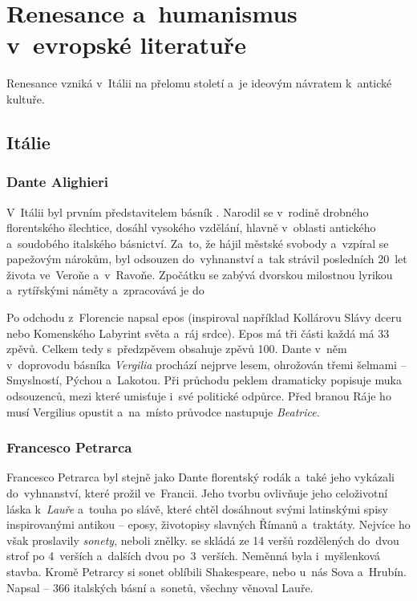 \chapter[Evropská renesance a~humanismus]{Renesance a~humanismus v~evropské literatuře}
Renesance vzniká v~Itálii na přelomu  století a~je ideovým návratem k~antické kultuře.
\section{Itálie}
\subsection*{Dante Alighieri}
V~Itálii byl prvním představitelem básník . Narodil se v~rodině drobného florentského %
šlechtice, dosáhl vysokého vzdělání, hlavně v~oblasti antického a~soudobého italského básnictví. Za~to, že hájil
městské svobody a~vzpíral se papežovým nárokům, byl odsouzen do~vyhnanství a~tak strávil posledních 20~let života
ve~Veroňe a~v~Ravoňe. Zpočátku se zabývá dvorskou milostnou lyrikou a~rytířskými náměty a~zpracovává je do~

Po odchodu z~Florencie napsal epos  (inspiroval například Kollárovu 
Slávy dceru nebo Komenského Labyrint světa a~ráj srdce). 
Epos má tři části  každá má 33 zpěvů. Celkem tedy s~předzpěvem obsahuje zpěvů 100.
Dante v~něm v~doprovodu básníka \textit{Vergilia} prochází nejprve lesem, ohrožován třemi šelmami -- Smyslností, Pýchou a~Lakotou.
Při průchodu peklem dramaticky popisuje muka odsouzenců, mezi které umisťuje i~své politické odpůrce.
Před branou Ráje ho musí Vergilius opustit a~na~místo průvodce nastupuje \textit{Beatrice}.

\subsection*{Francesco Petrarca}
Francesco Petrarca byl stejně jako Dante florentský rodák a~také jeho vykázali do~vyhnanství, které prožil ve~Francii.
Jeho tvorbu ovlivňuje jeho celoživotní láska k~\textit{Lauře} a~touha po slávě, které chtěl dosáhnout svými latinskými
spisy inspirovanými antikou -- eposy, životopisy slavných Římanů a~traktáty. Nejvíce ho však proslavily \textit{sonety}, 
neboli znělky.  se skládá ze 14 veršů rozdělených do~dvou strof po 4~verších a~dalších dvou 
po~3~verších. Neměnná byla i~myšlenková stavba. Kromě Petrarcy si sonet oblíbili Shakespeare, nebo u~nás Sova a~Hrubín.
Napsal  -- 366 italských básní a~sonetů, všechny věnoval Lauře.


